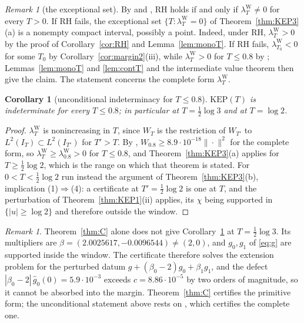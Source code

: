 \documentclass[11pt]{amsart}
\newtheorem{corollary}[theorem]{Corollary}
\theoremstyle{definition}
\theoremstyle{remark}
\newtheorem{remark}[theorem]{Remark}
\newcommand{\IT}{I_T}
\newcommand{\lamW}{\lambda^{\mathrm W}_T}
\newcommand{\gh}[1]{\widehat g_{#1}}
\begin{document}
\begin{remark}[the exceptional set]\label{rem:nonzero}
By \cite[Thms.~1, 3, 5]{Bombieri2000} and \cite[Thm.~11.3]{Paper45}, RH holds if and only if
$\lamW\ne0$ for every $T>0$. If RH fails, the exceptional set $\{T:\lamW=0\}$ of
Theorem~\ref{thm:KEP3}(a) is a nonempty compact interval, possibly a point. Indeed, under RH,
$\lamW>0$ by the proof of Corollary~\ref{cor:RH} and Lemma~\ref{lem:monoT}. If RH fails,
$\lambda^{\mathrm W}_{T_0}<0$ for some $T_0$ by Corollary~\ref{cor:margin2}(iii), while $\lamW>0$ for
$T\le0.8$ by \cite[Thm.~1.2]{Zhu2026}; Lemmas~\ref{lem:monoT} and \ref{lem:contT} and the
intermediate value theorem then give the claim. The statement concerns the complete form $\lamW$.
\end{remark}

\begin{corollary}[unconditional indeterminacy for $T\le0.8$]\label{cor:KEP08}
$\mathrm{KEP}(T)$ is indeterminate for every $T\le0.8$; in particular at $T=\frac12\log3$ and at
$T=\log2$.
\end{corollary}
\begin{proof}
$\lamW$ is nonincreasing in $T$, since $W_T$ is the restriction of $W_{T'}$ to
$L^2(\IT)\subset L^2(I_{T'})$ for $T'>T$. By \cite[Thm.~1.2]{Zhu2026},
$W_{0.8}\ge8.9\cdot10^{-18}\|\cdot\|^2$ for the complete form, so
$\lamW\ge\lambda^{\mathrm W}_{0.8}>0$ for $T\le0.8$, and Theorem~\ref{thm:KEP3}(a) applies for
$T\ge\frac12\log2$, which is the range on which that theorem is stated. For $0<T<\frac12\log2$ run
instead the argument of Theorem~\ref{thm:KEP3}(b), implication (1)$\Rightarrow$(4): a certificate at
$T'=\frac12\log2$ is one at $T$, and the perturbation of Theorem~\ref{thm:KEP1}(ii) applies, its
$\chi$ being supported in $\{|u|\ge\log2\}$ and therefore outside the window.
\end{proof}

\begin{remark}
Theorem~\ref{thm:C} alone does not give Corollary~\ref{cor:KEP08} at $T=\frac12\log3$. Its
multipliers are $\beta=(2.0025617,-0.0096544)\ne(2,0)$, and $g_0,g_1$ of \eqref{eq:g} are supported
inside the window. The certificate therefore solves the extension problem for the perturbed
datum $g+(\beta_0-2)g_0+\beta_1g_1$, and the defect $|\beta_0-2|\,\gh0(0)=5.9\cdot10^{-3}$ exceeds
$c=8.86\cdot10^{-5}$ by two orders of magnitude, so it cannot be absorbed into the margin.
Theorem~\ref{thm:C} certifies the primitive form; the unconditional statement above rests on
\cite{Zhu2026}, which certifies the complete one.
\end{remark}
\end{document}
